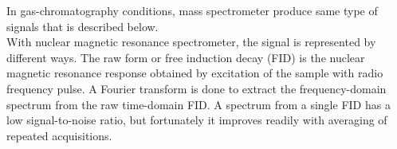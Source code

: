 \begin{figure}[htbp]
	\centering
	\quad
\end{figure}

In gas-chromatography conditions, mass spectrometer produce same type of signals that is described below.\\


With nuclear magnetic resonance spectrometer, the signal is represented by different ways. The raw form or free induction decay (FID) is the nuclear magnetic resonance response obtained by excitation of the sample with radio frequency pulse. A Fourier transform is done to extract the frequency-domain spectrum from the raw time-domain FID. A spectrum from a single FID has a low signal-to-noise ratio, but fortunately it improves readily with averaging of repeated acquisitions.

